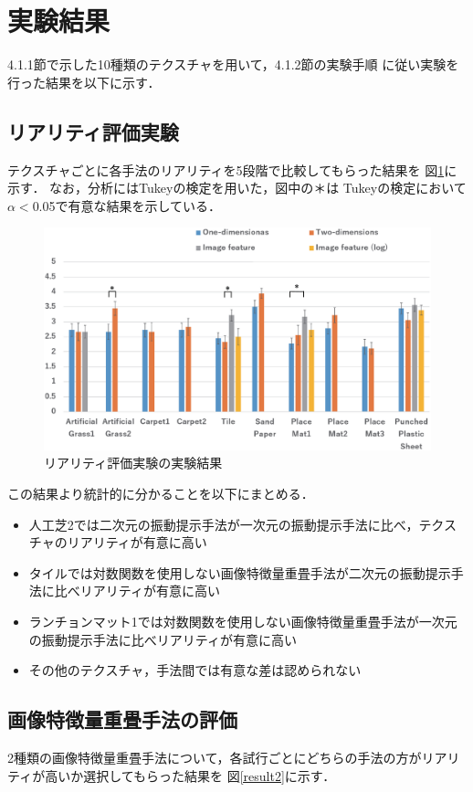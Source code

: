 \section{実験結果}
4.1.1節で示した10種類のテクスチャを用いて，4.1.2節の実験手順
に従い実験を行った結果を以下に示す．

\subsection{リアリティ評価実験}
テクスチャごとに各手法のリアリティを5段階で比較してもらった結果を
図\ref{5-2}に示す．
なお，分析にはTukeyの検定を用いた，図中の＊は
Tukeyの検定において$\alpha<$0.05で有意な結果を示している．
\begin{figure}[h]
\begin{center}
  \includegraphics[width=15cm]{result1.eps}
  \caption{リアリティ評価実験の実験結果}
  \label{5-2}
\end{center}
\end{figure}
この結果より統計的に分かることを以下にまとめる．
\begin{itemize}
  \item 人工芝2では二次元の振動提示手法が一次元の振動提示手法に比べ，テクスチャのリアリティが有意に高い
  \item タイルでは対数関数を使用しない画像特徴量重畳手法が二次元の振動提示手法に比べリアリティが有意に高い
  \item ランチョンマット1では対数関数を使用しない画像特徴量重畳手法が一次元の振動提示手法に比べリアリティが有意に高い
  \item その他のテクスチャ，手法間では有意な差は認められない
\end{itemize}

\subsection{画像特徴量重畳手法の評価}
2種類の画像特徴量重畳手法について，各試行ごとにどちらの手法の方がリアリティが高いか選択してもらった結果を
図\ref{result2}に示す．

